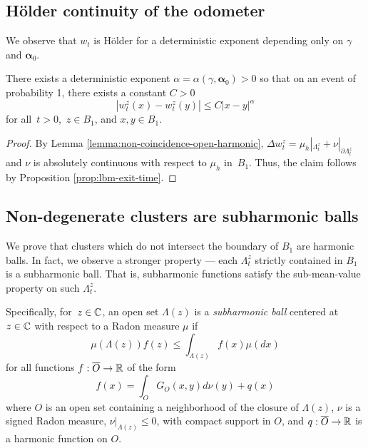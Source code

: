 \documentclass[12pt]{amsart}
\numberwithin{equation}{section}
\newcommand{\lss}[2]{\hyperref[eq:least-super-solution]{w^{#1}_{#2}}}
\newcommand{\cluster}[2]{\hyperref[eq:non-co-set]{\mathit{\Lambda}^{#1}_{#2}}}
\begin{document}
	
	\subsection{H\"{o}lder continuity of the odometer}
	We observe that $\lss{}{t}$ is H\"{o}lder for a deterministic exponent depending only on $\gamma$ and $\boldsymbol{\alpha}_0$. 



	\begin{lemma} \label{odometer:cont}
		There exists a deterministic exponent $\alpha = \alpha(\gamma,\boldsymbol{\alpha}_0) > 0$ so that on an event of probability 1, there
		exists a constant $C > 0$
		\[
		|\lss{z}{t}(x) - \lss{z}{t}(y)| \leq C |x-y|^{\alpha}
		\]
		for all~$t > 0$,~$z \in B_1$, and $x,y \in B_1$. 
	\end{lemma}
	
	\begin{proof}
		By Lemma \ref{lemma:non-coincidence-open-harmonic}, $\Delta \lss{z}{t} = \mu_h |_{{{\cluster{z}{t}}}} + \nu |_{\partial {\cluster{z}{t}}}$
		and $\nu$ is absolutely continuous with respect to $\mu_h$ in~$B_1$. Thus, the claim follows by Proposition  \ref{prop:lbm-exit-time}.
	\end{proof}
	
	\subsection{Non-degenerate clusters are subharmonic balls} \label{subsec:subharmonic}
	We prove that clusters which do not intersect the boundary of $B_1$ are harmonic balls. 
	In fact, we observe a stronger property --- each ${\cluster{z}{t}}$ strictly contained in $B_1$ 
	is a subharmonic ball. That is, subharmonic functions satisfy the sub-mean-value property 
	on such ${\cluster{z}{t}}$.
	
	Specifically, for~$z \in \mathbb{C}$, an open set $\Lambda(z)$ is a {\it subharmonic ball} centered at~$z \in \mathbb{C}$  with respect to a Radon measure $\mu$ if 
	\begin{equation} \label{eq:subharmonic-ball}
	\mu(\Lambda(z)) f(z)  \leq \int_{\Lambda(z)} f(x) \mu(d x)
	\end{equation}
	for all functions $f: \overline{O} \to \mathbb{R}$ of the form
	\begin{equation} \label{eq:sub-harmonic-potential}
	f(x) = \int_{O} G_{O}(x,y) d \nu(y) + q(x)
	\end{equation}
	where $O$ is an open set containing a neighborhood of the closure of $\Lambda(z)$,
	$\nu$ is a signed Radon measure, $\nu |_{\Lambda(z)} \leq 0$, with compact support in $O$,
	and $q:\overline{O} \to \mathbb{R}$ is a harmonic function on $O$.
	
\end{document}
